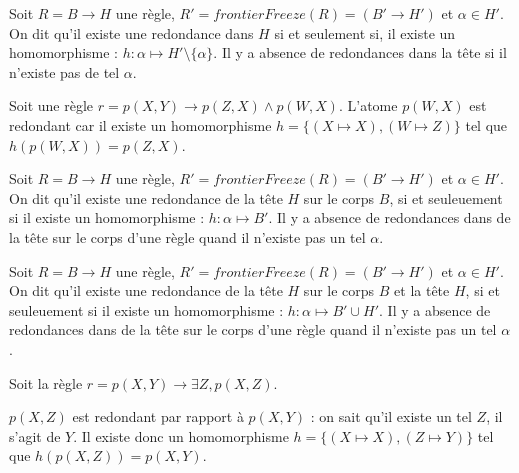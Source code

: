 \begin{definition} \label{def:head_redundancy}
Soit $R = B \rightarrow H$ une règle, $R' = frontierFreeze(R) = (B' \rightarrow H')$ et $\alpha \in H'$. On dit qu'il existe une redondance dans $H$ si et seulement si, il existe un homomorphisme : $h : \alpha \mapsto H'\setminus\{\alpha\}$.  
Il y a absence de redondances dans la tête si il n'existe pas de tel $\alpha$.
\end{definition}

\begin{example}
    Soit une règle $r = p(X,Y) \rightarrow p(Z,X)\land p(W,X) $. L'atome $p(W,X)$ est redondant car il existe un homomorphisme $h = \{(X \mapsto X), (W \mapsto Z)\}$ tel que $h(p(W,X)) = p(Z,X)$.
\end{example}

\begin{definition}\label{def:headToBody_redundancy}
 Soit $R = B \rightarrow H$ une règle, $R' = frontierFreeze(R) = (B' \rightarrow H')$ et $\alpha \in H'$. On dit qu'il existe une redondance de la tête $H$ sur le corps $B$, si et seuleuement si il existe un homomorphisme : $h : \alpha \mapsto B'$.
 Il y a absence de redondances dans de la tête sur le corps d'une règle quand il n'existe pas un tel $\alpha$.
\end{definition}

\begin{definition}\label{def:headToBodyAndHead_redundancy}
 Soit $R = B \rightarrow H$ une règle, $R' = frontierFreeze(R) = (B' \rightarrow H')$ et $\alpha \in H'$. On dit qu'il existe une redondance de la tête $H$ sur le corps $B$ et la tête $H$, si et seuleuement si il existe un homomorphisme : $h : \alpha \mapsto B' \cup H'$.
 Il y a absence de redondances dans de la tête sur le corps d'une règle quand il n'existe pas un tel $\alpha$.
\end{definition}

\begin{example}
Soit la règle $r = p(X, Y) \rightarrow \exists Z, p(X, Z)$.
\par $p(X,Z)$ est redondant par rapport à $p(X,Y)$ : on sait qu'il existe un tel $Z$, il s'agit de $Y$. Il existe donc un homomorphisme $h = \{(X\mapsto X), (Z \mapsto Y)\}$ tel que $h(p(X,Z)) = p(X,Y)$.

\end{example}

